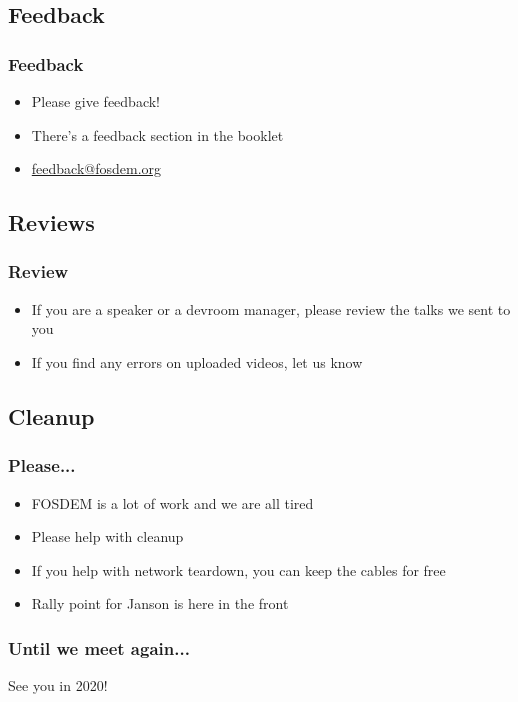 \documentclass[aspectratio=169]{beamer}
\begin{document}
\subsection{Feedback}

\begin{frame}
	\frametitle{Feedback}
	\vfill
	\begin{itemize}
		\item Please give feedback!
		\item There's a feedback section in the booklet
		\item \url{feedback@fosdem.org}
	\end{itemize}
	\vfill
\end{frame}

\subsection{Reviews}

\begin{frame}
	\frametitle{Review}
	\vfill
	\begin{itemize}
		\item If you are a speaker or a devroom manager, please review the talks we sent to you
		\item If you find any errors on uploaded videos, let us know
	\end{itemize}
	\vfill
\end{frame}

\subsection{Cleanup}

\begin{frame}
	\frametitle{Please...}
	\vfill
	\begin{itemize}
		\item FOSDEM is a lot of work and we are all tired
		\item Please help with cleanup
		\item If you help with network teardown, you can keep the cables for free
		\item Rally point for Janson is here in the front
	\end{itemize}
	\vfill
\end{frame}

\begin{frame}
	\frametitle{Until we meet again...}
	\vfill
	\begin{center}
		{\Huge See you in 2020!}
	\end{center}
	\vfill
\end{frame}
\end{document}
